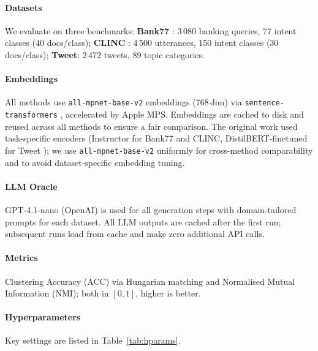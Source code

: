 \documentclass[10pt,twocolumn,a4paper]{article}
\begin{document}
\paragraph{Datasets}
We evaluate on three benchmarks:
\textbf{Bank77} \citep{casanueva2020efficient}: 3\,080 banking queries, 77
intent classes (40 docs/class);
\textbf{CLINC} \citep{larson2019evaluation}: 4\,500 utterances, 150 intent
classes (30 docs/class);
\textbf{Tweet}: 2\,472 tweets, 89 topic categories.

\paragraph{Embeddings}
All methods use \texttt{all-mpnet-base-v2} embeddings (768\,dim) via
\texttt{sentence-transformers} \citep{reimers2019sentence}, accelerated by
Apple MPS.
Embeddings are cached to disk and reused across all methods to ensure a fair
comparison.
The original work used task-specific encoders (Instructor for Bank77 and CLINC,
DistilBERT-finetuned for Tweet \citep{viswanathan2023large}); we use
\texttt{all-mpnet-base-v2} uniformly for cross-method comparability and
to avoid dataset-specific embedding tuning.

\paragraph{LLM Oracle}
GPT-4.1-nano (OpenAI) is used for all generation steps with domain-tailored
prompts for each dataset.
All LLM outputs are cached after the first run; subsequent runs load from
cache and make zero additional API calls.

\paragraph{Metrics}
Clustering Accuracy (ACC) via Hungarian matching \citep{strehl2002cluster}
and Normalised Mutual Information (NMI); both in $[0,1]$, higher is better.

\paragraph{Hyperparameters}
Key settings are listed in Table~\ref{tab:hparams}.
\end{document}
